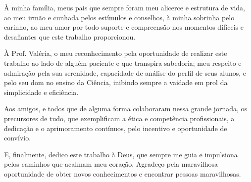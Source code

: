 À minha família, meus pais que sempre foram meu alicerce e estrutura de vida, ao meu irmão e cunhada pelos estímulos e conselhos, à minha sobrinha pelo carinho, ao meu amor por todo suporte e compreensão nos momentos difíceis e desafiantes que este trabalho proporcionou.

À Prof. Valéria, o meu reconhecimento pela oportunidade de realizar este trabalho ao lado de alguém paciente e que transpira sabedoria; meu respeito e admiração pela sua serenidade, capacidade de análise do perfil de seus alunos, e pelo seu dom no ensino da Ciência, inibindo sempre a vaidade em prol da simplicidade e eficiência.

Aos amigos, e todos que de alguma forma colaboraram nessa grande jornada, os precursores de tudo, que exemplificam a ética e competência profissionais, a dedicação e o aprimoramento contínuos, pelo incentivo e oportunidade de convívio.

E, finalmente, dedico este trabalho à Deus, que sempre me guia e impulsiona pelos caminhos que acalmam meu coração. Agradeço pela maravilhosa oportunidade de obter novos conhecimentos e encontrar pessoas maravilhosas.